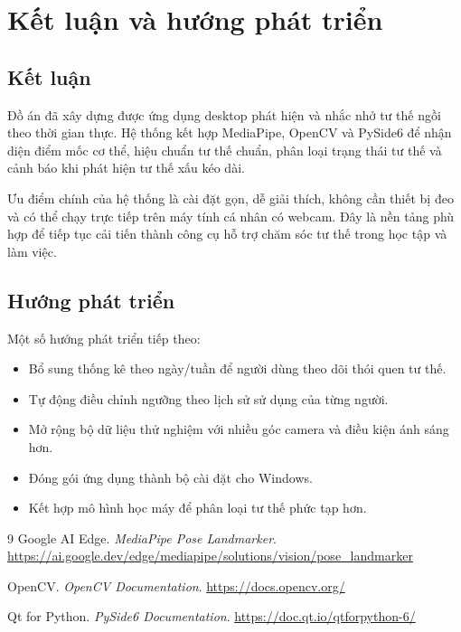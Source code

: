 \documentclass[12pt,a4paper,oneside]{report}
\begin{document}
\chapter{Kết luận và hướng phát triển}

\section{Kết luận}
Đồ án đã xây dựng được ứng dụng desktop phát hiện và nhắc nhở tư thế ngồi theo thời gian thực. Hệ thống kết hợp MediaPipe, OpenCV và PySide6 để nhận diện điểm mốc cơ thể, hiệu chuẩn tư thế chuẩn, phân loại trạng thái tư thế và cảnh báo khi phát hiện tư thế xấu kéo dài.

Ưu điểm chính của hệ thống là cài đặt gọn, dễ giải thích, không cần thiết bị đeo và có thể chạy trực tiếp trên máy tính cá nhân có webcam. Đây là nền tảng phù hợp để tiếp tục cải tiến thành công cụ hỗ trợ chăm sóc tư thế trong học tập và làm việc.

\section{Hướng phát triển}
Một số hướng phát triển tiếp theo:
\begin{itemize}[leftmargin=1.2cm]
    \item Bổ sung thống kê theo ngày/tuần để người dùng theo dõi thói quen tư thế.
    \item Tự động điều chỉnh ngưỡng theo lịch sử sử dụng của từng người.
    \item Mở rộng bộ dữ liệu thử nghiệm với nhiều góc camera và điều kiện ánh sáng hơn.
    \item Đóng gói ứng dụng thành bộ cài đặt cho Windows.
    \item Kết hợp mô hình học máy để phân loại tư thế phức tạp hơn.
\end{itemize}

\begin{thebibliography}{9}
    Google AI Edge. \textit{MediaPipe Pose Landmarker}. \url{https://ai.google.dev/edge/mediapipe/solutions/vision/pose_landmarker}

    OpenCV. \textit{OpenCV Documentation}. \url{https://docs.opencv.org/}

    Qt for Python. \textit{PySide6 Documentation}. \url{https://doc.qt.io/qtforpython-6/}
\end{thebibliography}
\end{document}
